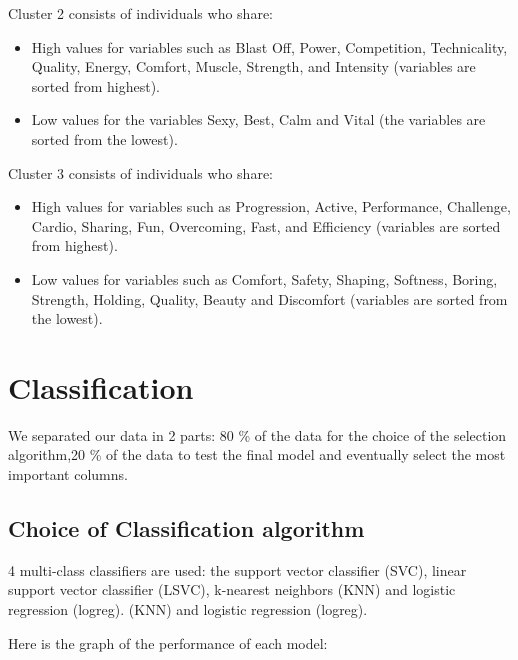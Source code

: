 \documentclass[12pt]{article}
\begin{document}
Cluster 2 consists of individuals who share:


\begin{itemize}
    \item High values for variables such as Blast Off, Power, Competition, Technicality, Quality, Energy, Comfort, Muscle, Strength, and Intensity (variables are sorted from highest).
    \item Low values for the variables Sexy, Best, Calm and Vital (the variables are sorted from the lowest).
\end{itemize}

Cluster 3 consists of individuals who share:

\begin{itemize}
    \item High values for variables such as Progression, Active, Performance, Challenge, Cardio, Sharing, Fun, Overcoming, Fast, and Efficiency (variables are sorted from highest).

    \item Low values for variables such as Comfort, Safety, Shaping, Softness, Boring, Strength, Holding, Quality, Beauty and Discomfort (variables are sorted from the lowest).

\end{itemize}


\section{Classification}  %
 
 We separated our data in 2 parts: 80 \% of the data for the choice of the selection algorithm,20 \% of the data to test the final model and eventually select the most important columns.
 
 
\subsection{Choice of Classification algorithm} 

 4 multi-class classifiers are used: the support vector classifier
(SVC), linear support vector classifier
(LSVC), k-nearest neighbors (KNN) and logistic regression (logreg). 
(KNN) and logistic regression (logreg).

Here is the graph of the performance of each model: 
\end{document}
